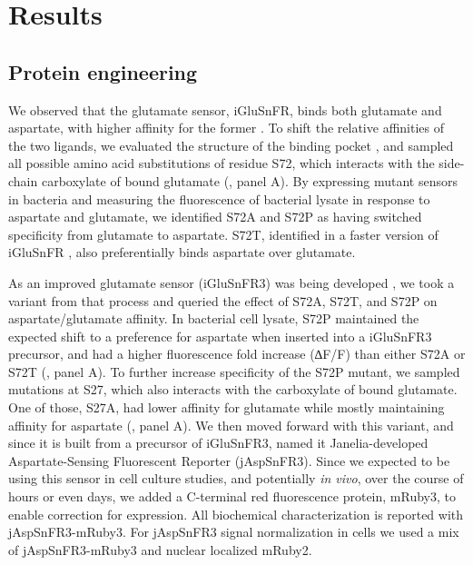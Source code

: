 \documentclass[9pt,lineno]{elife}
\begin{document}
\section{Results}

\subsection{Protein engineering}
We observed that the glutamate sensor, iGluSnFR, binds both glutamate and aspartate, with higher affinity for the former \citep{Marvin2013-qq}.
To shift the relative affinities of the two ligands, we evaluated the structure of the binding pocket  \citep{Hu2008-nd}, and sampled all possible amino acid substitutions of residue S72, which interacts with the side-chain carboxylate of bound glutamate (, panel A).
By expressing mutant sensors in bacteria and measuring the fluorescence of bacterial lysate in response to aspartate and glutamate, we identified S72A and S72P as having switched specificity from glutamate to aspartate.
S72T, identified in a faster version of iGluSnFR \citep{Helassa2018-fb}, also preferentially binds aspartate over glutamate.

As an improved glutamate sensor (iGluSnFR3) was being developed \citep{Aggarwal2023-pi}, we took a variant from that process and queried the effect of S72A, S72T, and S72P on aspartate/glutamate affinity.
In bacterial cell lysate, S72P maintained the expected shift to a preference for aspartate when inserted into a iGluSnFR3 precursor, and had a higher fluorescence fold increase (∆F/F) than either S72A or S72T (, panel A).
To further increase specificity of the S72P mutant, we sampled mutations at S27, which also interacts with the carboxylate of bound glutamate.
One of those, S27A, had lower affinity for glutamate while mostly maintaining affinity for aspartate (, panel A).
We then moved forward with this variant, and since it is built from a precursor of iGluSnFR3, named it Janelia-developed Aspartate-Sensing Fluorescent Reporter (jAspSnFR3).
Since we expected to be using this sensor in cell culture studies, and potentially \textit{in vivo}, over the course of hours or even days, we added a C-terminal red fluorescence protein, mRuby3, to enable correction for expression.
All biochemical characterization is reported with jAspSnFR3-mRuby3.
For jAspSnFR3 signal normalization in cells we used a mix of jAspSnFR3-mRuby3 and nuclear localized mRuby2.
\end{document}
